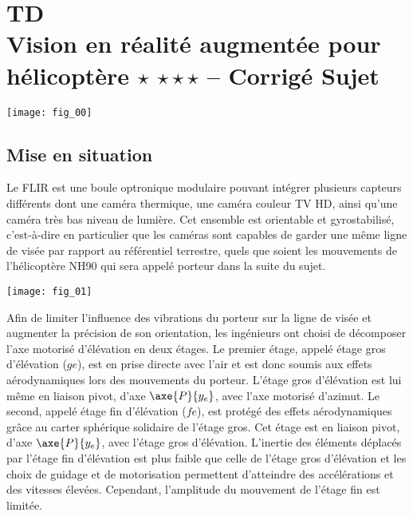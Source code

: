 \chapter*{TD  \\ 
Vision en réalité augmentée pour hélicoptère \ifnormal $\star$ \else \fi \iftdifficile $\star\star\star$ \else \fi -- 
\ifprof Corrigé \else Sujet \fi}

\iflivret {} \else
\ifprof  {} \else \fi
\fi

\setcounter{question}{0}

\begin{marginfigure}[3.5cm]
\centering
\texttt{[image: fig\_00]}
\end{marginfigure}


\section*{Mise en situation}
Le FLIR est une boule optronique modulaire pouvant intégrer plusieurs capteurs différents dont une caméra
thermique, une caméra couleur TV HD, ainsi qu’une caméra très bas niveau de lumière. Cet ensemble est
orientable et gyrostabilisé, c’est-à-dire en particulier que les caméras sont capables de garder une même ligne
de visée par rapport au référentiel terrestre, quels que soient les mouvements de l’hélicoptère NH90 qui sera
appelé porteur dans la suite du sujet.


\begin{marginfigure}[4cm]
\texttt{[image: fig\_01]}
\end{marginfigure}

Afin de limiter l’influence des vibrations du porteur sur la ligne de visée et augmenter la précision de son orientation,
les ingénieurs ont choisi de décomposer l’axe motorisé d’élévation en deux étages.
Le premier étage, appelé étage gros d’élévation ($ge$), est en prise directe avec l’air et est donc soumis aux effets
aérodynamiques lors des mouvements du porteur. L’étage gros d’élévation est lui même en liaison pivot, d’axe $\axe{P}{y_e}$, avec l’axe motorisé d’azimut. Le second, appelé étage fin d’élévation ($fe$), est protégé des effets aérodynamiques grâce au carter sphérique solidaire de l’étage gros. Cet étage est en liaison pivot,
d’axe $\axe{P}{y_e}$, avec l’étage gros d’élévation. L’inertie des éléments déplacés par l’étage fin d’élévation est plus faible
que celle de l’étage gros d’élévation et les choix de guidage et de motorisation permettent d’atteindre des accélérations
et des vitesses élevées. Cependant, l’amplitude du mouvement de l’étage fin est limitée. 



